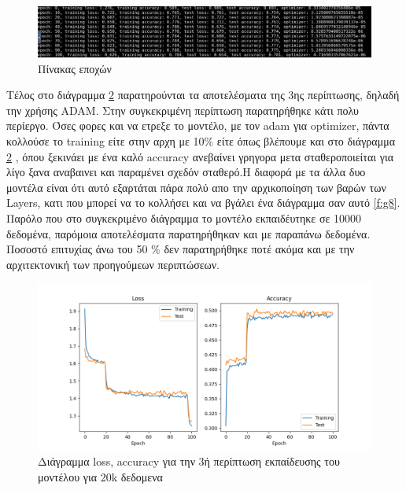 \begin{figure}[ht]
	\centering
	\includegraphics[width=1\linewidth]{Results/Optimizers/optimizer_sgd_2_20k1.png}
	\caption{ Πίνακας εποχών}
	\label{f:g6}	
\end{figure}
\clearpage

Τέλος στο διάγραμμα \ref{f:g7} παρατηρούνται τα αποτελέσματα της 3ης περίπτωσης, δηλαδή την χρήσης ADAM. Στην συγκεκριμένη περίπτωση παρατηρήθηκε κάτι πολυ περίεργο. Όσες φορες και να ετρεξε το μοντέλο, με τον adam για optimizer, πάντα κολλούσε το training είτε στην αρχη με 10$\%$ είτε όπως βλέπουμε και στο διάγραμμα \ref{f:g7} , όπου ξεκινάει με ένα καλό accuracy ανεβαίνει γρηγορα μετα σταθεροποιείται για λίγο ξανα αναβαινει και παραμένει σχεδόν σταθερό.Η διαφορά με τα άλλα δυο μοντέλα είναι ότι 
αυτό εξαρτάται πάρα πολύ απο την αρχικοποίηση των βαρών των Layers, κατι που μπορεί να το κολλήσει και να βγάλει ένα διάγραμμα σαν αυτό \ref{f:g8}. Παρόλο που στο συγκεκριμένο διάγραμμα το μοντέλο εκπαιδέυτηκε σε 10000 δεδομένα, παρόμοια αποτελέσματα παρατηρήθηκαν και με παραπάνω δεδομένα. Ποσοστό επιτυχίας άνω του 50 $\%$ δεν παρατηρήθηκε ποτέ ακόμα και με την αρχιτεκτονική των προηγούμεων περιπτώσεων.


\begin{figure}[ht]
	\centering
	\includegraphics[width=1\linewidth]{Results/Optimizers/without_dropout_adam_20k.png}
	\caption{ Διάγραμμα loss, accuracy για την 3ή περίπτωση εκπαίδευσης του μοντέλου για 20k δεδομενα}
	\label{f:g7}	
\end{figure}


